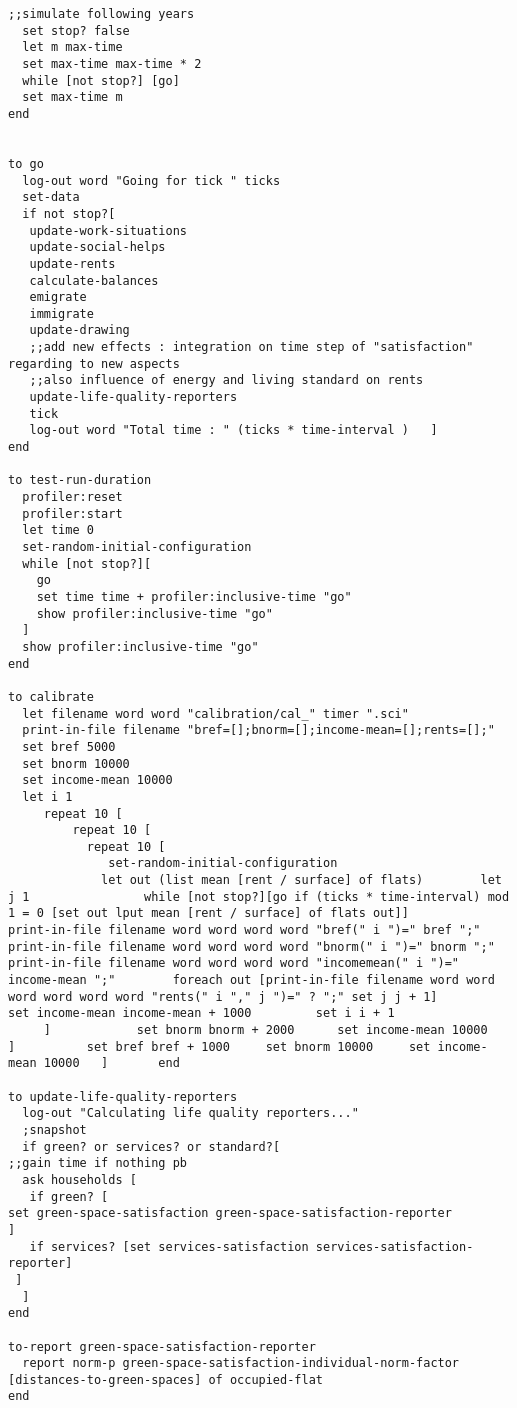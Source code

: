 \documentclass[english]{article}
\begin{document}
\begin{lstlisting}[basicstyle={\scriptsize}]
  ;;simulate following years
  set stop? false 
  let m max-time
  set max-time max-time * 2
  while [not stop?] [go]
  set max-time m 
end


to go
  log-out word "Going for tick " ticks
  set-data
  if not stop?[
   update-work-situations
   update-social-helps
   update-rents
   calculate-balances
   emigrate
   immigrate
   update-drawing
   ;;add new effects : integration on time step of "satisfaction" regarding to new aspects
   ;;also influence of energy and living standard on rents
   update-life-quality-reporters
   tick
   log-out word "Total time : " (ticks * time-interval )   ]
end

to test-run-duration
  profiler:reset
  profiler:start
  let time 0
  set-random-initial-configuration
  while [not stop?][
    go
    set time time + profiler:inclusive-time "go"
    show profiler:inclusive-time "go"
  ]
  show profiler:inclusive-time "go"
end

to calibrate
  let filename word word "calibration/cal_" timer ".sci"
  print-in-file filename "bref=[];bnorm=[];income-mean=[];rents=[];"
  set bref 5000
  set bnorm 10000
  set income-mean 10000
  let i 1
     repeat 10 [
         repeat 10 [
           repeat 10 [
              set-random-initial-configuration
             let out (list mean [rent / surface] of flats)        let j 1                while [not stop?][go if (ticks * time-interval) mod 1 = 0 [set out lput mean [rent / surface] of flats out]]          print-in-file filename word word word word "bref(" i ")=" bref ";"        print-in-file filename word word word word "bnorm(" i ")=" bnorm ";"        print-in-file filename word word word word "incomemean(" i ")=" income-mean ";"        foreach out [print-in-file filename word word word word word word "rents(" i "," j ")=" ? ";" set j j + 1]               set income-mean income-mean + 1000         set i i + 1
     ]            set bnorm bnorm + 2000      set income-mean 10000      ]          set bref bref + 1000     set bnorm 10000     set income-mean 10000   ]       end

to update-life-quality-reporters
  log-out "Calculating life quality reporters..."
  ;snapshot
  if green? or services? or standard?[ 
;;gain time if nothing pb
  ask households [ 
   if green? [
set green-space-satisfaction green-space-satisfaction-reporter
] 
   if services? [set services-satisfaction services-satisfaction-reporter] 
 ]
  ]
end

to-report green-space-satisfaction-reporter 
  report norm-p green-space-satisfaction-individual-norm-factor [distances-to-green-spaces] of occupied-flat
end


\end{lstlisting}
\end{document}
